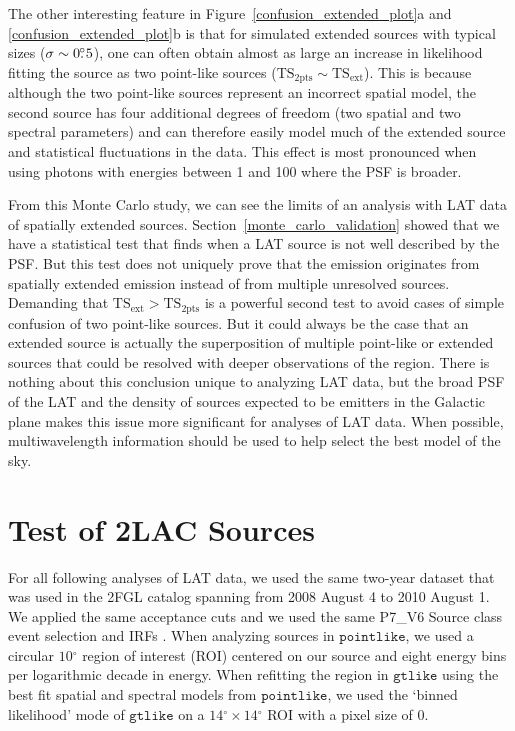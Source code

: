 \documentclass[12pt,preprint]{aastex}
\newcommand{\gev}{\text{GeV}\xspace}
\newcommand{\tsext}{{\ensuremath{\text{TS}_{\text{ext}}}}\xspace}
\newcommand{\tsinc}{\ensuremath{\text{TS}_{\text{2pts}}}\xspace}
\newcommand{\gtlike}{\ensuremath{\mathtt{gtlike}}\xspace}
\newcommand{\pointlike}{\ensuremath{\mathtt{pointlike}}\xspace}
\newcommand{\degree}{\ensuremath{^\circ}\xspace}
\begin{document}
The other interesting feature in Figure~\ref{confusion_extended_plot}a
and \ref{confusion_extended_plot}b is that for simulated extended
sources with typical sizes ($\sigma\sim0\mbox{$.\!\!^\circ$}5$), one can often obtain
almost as large an increase in likelihood fitting the source as two
point-like sources ($\tsinc\sim\tsext$).  This is because although the
two point-like sources represent an incorrect spatial model, the second
source has four additional degrees of freedom (two spatial and two
spectral parameters) and can therefore easily model much of the extended
source and statistical fluctuations in the data.  This effect is most
pronounced when using photons with energies between 1 \gev and 100 \gev
where the PSF is broader.

From this Monte Carlo study, we can see the limits of an analysis with
LAT data of spatially extended sources.  Section~\ref{monte_carlo_validation}
showed that we have a statistical test that finds when a LAT source is
not well described by the PSF.  But this test does not uniquely prove
that the emission originates from spatially extended emission instead
of from multiple unresolved sources.  Demanding that $\tsext>\tsinc$
is a powerful second test to avoid cases of simple confusion of two
point-like sources. But it could always be the case that an extended
source is actually the superposition of multiple point-like or
extended sources that could be resolved with deeper observations of the
region.  There is nothing about this conclusion unique to analyzing LAT data,
but the broad PSF of the LAT and the density of sources expected to be
\gev emitters in the Galactic plane makes this issue more significant
for analyses of LAT data.  When possible, multiwavelength information should be
used to help select the best model of the sky.


\section{Test of 2LAC Sources}
\label{test_2lac_sources}


For all following analyses of LAT data, we used the same two-year dataset
that was used in the 2FGL catalog spanning from 2008 August 4 to 2010 August 1. We
applied the same acceptance cuts and we used the same P7\_V6 Source class
event selection and IRFs \citep{lat_on_orbit_psf}.  
When analyzing sources in \pointlike, we used a circular $10\degree$ region of
interest (ROI) centered on our source and eight energy bins per
logarithmic decade in energy.
When refitting the region in \gtlike using the best fit spatial and
spectral models from \pointlike, we used the `binned likelihood' mode of
\gtlike on a $14\degree\times14\degree$ ROI with a pixel size of 0.
\end{document}
